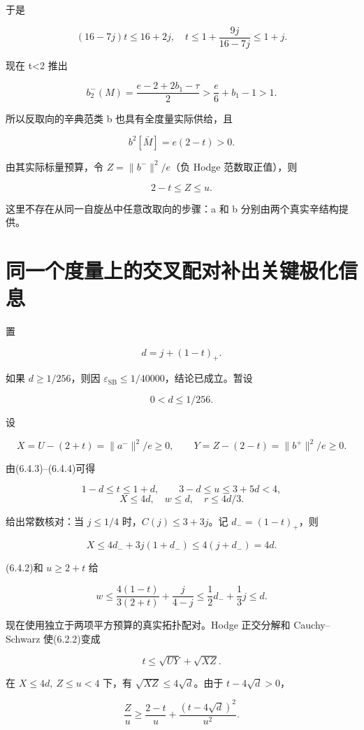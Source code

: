 \documentclass[UTF8,11pt,fontset=none]{ctexart}
\theoremstyle{definition}
\theoremstyle{remark}
\begin{document}
于是

\[
(16-7j)t\le16+2j,
\quad
\boxed{t\le1+\frac{9j}{16-7j}\le1+j.}
\tag{6.4.4}
\]

现在 t\textless2 推出

\[
b_2^-(M)=\frac{e-2+2b_1-\tau}{2}
>\frac e6+b_1-1>1.
\]

所以反取向的辛典范类 b 也具有全度量实际供给，且

\[
b^2[\bar M]=e(2-t)>0.
\]

由其实际标量预算，令 \(Z=\|b^-\|^2/e\)（负 Hodge 范数取正值），则

\[
2-t\le Z\le u.
\tag{6.4.5}
\]

这里不存在从同一自旋丛中任意改取向的步骤：a 和 b 分别由两个真实辛结构提供。

\section{同一个度量上的交叉配对补出关键极化信息}\label{v6-ux540cux4e00ux4e2aux5ea6ux91cfux4e0aux7684ux4ea4ux53c9ux914dux5bf9ux8865ux51faux5173ux952eux6781ux5316ux4fe1ux606f}

置

\[
d=j+(1-t)_+.
\]

如果 \(d\ge1/256\)，则因 \(\varepsilon_{\mathrm{SB}}\le1/40000\)，结论已成立。暂设

\[
0<d\le1/256.
\tag{6.5.1}
\]

设

\[
X=U-(2+t)=\|a^-\|^2/e\ge0,
\qquad Y=Z-(2-t)=\|b^+\|^2/e\ge0.
\]

由(6.4.3)--(6.4.4)可得

\[
1-d\le t\le1+d,\qquad 3-d\le u\le3+5d<4,
\] \[
\boxed{X\le4d,\quad w\le d,\quad r\le4d/3.}
\tag{6.5.2}
\]

给出常数核对：当 \(j\le 1/4\) 时，\(C(j)\le3+3j\)。记 \(d_-=(1-t)_+\)，则

\[
X\le4d_-+3j(1+d_-)\le4(j+d_-)=4d.
\]

(6.4.2)和 \(u\ge2+t\) 给

\[
w\le\frac{4(1-t)}{3(2+t)}+\frac{j}{4-j}
\le\frac12d_-+\frac13j\le d.
\]

现在使用独立于两项平方预算的真实拓扑配对。Hodge 正交分解和 Cauchy--Schwarz 使(6.2.2)变成

\[
\boxed{t\le\sqrt{UY}+\sqrt{XZ}.}
\tag{6.5.3}
\]

在 \(X\le4d,\ Z\le u<4\) 下，有 \(\sqrt{XZ}\le4\sqrt d\)。由于 \(t-4\sqrt d>0\)，

\[
\frac Zu\ge\frac{2-t}{u}
+\frac{(t-4\sqrt d)^2}{u^2}.
\tag{6.5.4}
\]
\end{document}
